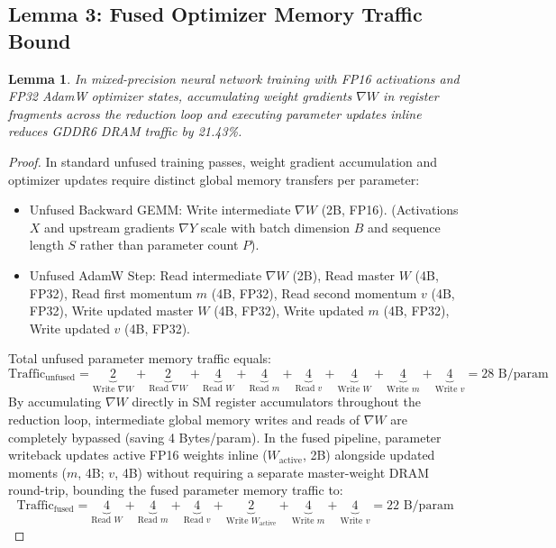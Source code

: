 \documentclass[10pt,twocolumn,letterpaper]{article}
\newtheorem{lemma}{Lemma}
\begin{document}
\subsection{Lemma 3: Fused Optimizer Memory Traffic Bound}
\begin{lemma}
In mixed-precision neural network training with FP16 activations and FP32 AdamW optimizer states, accumulating weight gradients $\nabla W$ in register fragments across the reduction loop and executing parameter updates inline reduces GDDR6 DRAM traffic by 21.43\%.
\end{lemma}

\begin{proof}
In standard unfused training passes, weight gradient accumulation and optimizer updates require distinct global memory transfers per parameter:
\begin{itemize}
  \item Unfused Backward GEMM: Write intermediate $\nabla W$ (2B, FP16). (Activations $X$ and upstream gradients $\nabla Y$ scale with batch dimension $B$ and sequence length $S$ rather than parameter count $P$).
  \item Unfused AdamW Step: Read intermediate $\nabla W$ (2B), Read master $W$ (4B, FP32), Read first momentum $m$ (4B, FP32), Read second momentum $v$ (4B, FP32), Write updated master $W$ (4B, FP32), Write updated $m$ (4B, FP32), Write updated $v$ (4B, FP32).
\end{itemize}
Total unfused parameter memory traffic equals:
\begin{equation}
\text{Traffic}_{\text{unfused}} = \underbrace{2}_{\text{Write } \nabla W} + \underbrace{2}_{\text{Read } \nabla W} + \underbrace{4}_{\text{Read } W} + \underbrace{4}_{\text{Read } m} + \underbrace{4}_{\text{Read } v} + \underbrace{4}_{\text{Write } W} + \underbrace{4}_{\text{Write } m} + \underbrace{4}_{\text{Write } v} = 28\text{ B/param}
\end{equation}
By accumulating $\nabla W$ directly in SM register accumulators throughout the reduction loop, intermediate global memory writes and reads of $\nabla W$ are completely bypassed (saving 4 Bytes/param). In the fused pipeline, parameter writeback updates active FP16 weights inline ($W_{\text{active}}$, 2B) alongside updated moments ($m$, 4B; $v$, 4B) without requiring a separate master-weight DRAM round-trip, bounding the fused parameter memory traffic to:
\begin{equation}
\text{Traffic}_{\text{fused}} = \underbrace{4}_{\text{Read } W} + \underbrace{4}_{\text{Read } m} + \underbrace{4}_{\text{Read } v} + \underbrace{2}_{\text{Write } W_{\text{active}}} + \underbrace{4}_{\text{Write } m} + \underbrace{4}_{\text{Write } v} = 22\text{ B/param}

\end{equation}
\end{proof}
\end{document}
